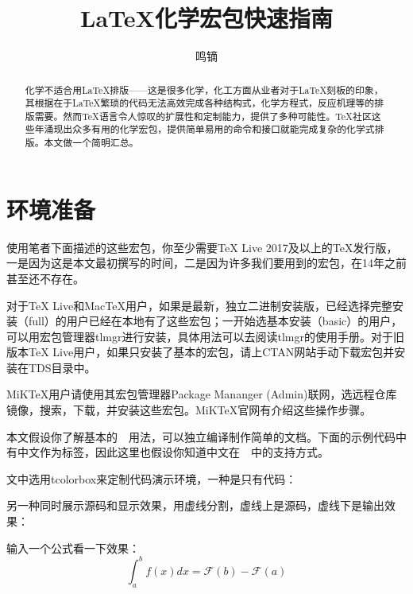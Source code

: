\documentclass[a4paper,UTF8,zihao = -4]{ctexart} %
\title{\textsf{\LaTeX}\heiti 化学宏包快速指南}
\author{\fangsong 鸣镝}
\date{\oldstylenums{2018/04/23}}
\begin{document}
\pagecolor{lightmilkyellow}

\maketitle %

\begin{abstract} 化学不适合用\LaTeX{}排版——这是很多化学，化工方面从业者对于\LaTeX{}刻板的印象，其根据在于\LaTeX{}繁琐的代码无法高效完成各种结构式，化学方程式，反应机理等的排版需要。然而\TeX{}语言令人惊叹的扩展性和定制能力，提供了多种可能性。\TeX{}社区这些年涌现出众多有用的化学宏包，提供简单易用的命令和接口就能完成复杂的化学式排版。本文做一个简明汇总。
\end{abstract}

\section{环境准备}
\label{sec:envimtPrep}

使用笔者下面描述的这些宏包，你至少需要\TeX{} Live 2017及以上的\TeX{}发行版，一是因为这是本文最初撰写的时间，二是因为许多我们要用到的宏包，在14年之前甚至还不存在。

对于\TeX{} Live和Mac\TeX{}用户，如果是最新，独立二进制安装版，已经选择完整安装（full）的用户已经在本地有了这些宏包；一开始选基本安装（basic）的用户，可以用宏包管理器\textsf{tlmgr}进行安装，具体用法可以去阅读\textsf{tlmgr}的使用手册。对于旧版本\TeX{} Live用户，如果只安装了基本的宏包，请上CTAN网站手动下载宏包并安装在TDS目录中。

MiK\TeX{}用户请使用其宏包管理器\textsf{Package Mananger (Admin)}联网，选远程仓库镜像，搜索，下载，并安装这些宏包。MiK\TeX{}官网有介绍这些操作步骤。

本文假设你了解基本的~\LaTeXe{}~用法，可以独立编译制作简单的文档。下面的示例代码中有中文作为标签，因此这里也假设你知道中文在~\LaTeXe{}~中的支持方式。

文中选用\textsf{tcolorbox}来定制代码演示环境，一种是只有代码：

\begin{dispListing}
\usepackage{tcolorbox} %
\end{dispListing}

另一种同时展示源码和显示效果，用虚线分割，虚线上是源码，虚线下是输出效果：

\begin{dispExample}
输入一个公式看一下效果：\[ \int _a^b f(x)dx = \mathcal{F}(b) - \mathcal{F}(a) \]
\end{dispExample}
\end{document}
